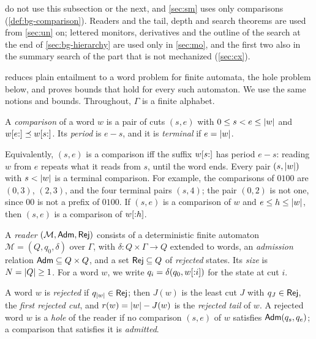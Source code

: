  do not use this subsection or the next, and
\cref{sec:sm} uses only comparisons (\cref{def:bg-comparison}). Readers
and the tail, depth and search theorems are used from \cref{sec:un} on;
lettered monitors, derivatives and the outline of the search at the end of
\cref{sec:bg-hierarchy} are used only in \cref{sec:mo}, and the first two also
in the summary search of the part that is not mechanized (\cref{sec:cx}).

 reduces plain entailment to a word problem for finite
automata, the hole problem below, and proves bounds that hold for every such
automaton. We use the same notions and bounds. Throughout, $\Gamma$ is a finite
alphabet.

\begin{definition}[Comparison]\label{def:bg-comparison}
A \emph{comparison} of a word $w$ is a pair of cuts $(s,e)$ with
$0\le s<e\le\lvert w\rvert$ and $w[e{:}]\preceq w[s{:}]$. Its \emph{period} is $e-s$, and
it is \emph{terminal} if $e=\lvert w\rvert$.
\end{definition}

Equivalently, $(s,e)$ is a comparison iff the suffix $w[s{:}]$ has period
$e-s$: reading $w$ from $e$ repeats what it reads from $s$, until the word ends.
Every pair $(s,\lvert w\rvert)$ with $s<\lvert w\rvert$ is a terminal comparison. For example,
the comparisons of $0100$ are $(0,3)$, $(2,3)$, and the four terminal pairs
$(s,4)$; the pair $(0,2)$ is not one, since $00$ is not a prefix of $0100$. If
$(s,e)$ is a comparison of $w$ and $e\le h\le\lvert w\rvert$, then $(s,e)$ is a
comparison of $w[{:}h]$.

\begin{definition}[Reader]\label{def:bg-reader}
A \emph{reader} $(\mathcal M,\mathsf{Adm},\mathsf{Rej})$ consists of a deterministic finite
automaton $\mathcal M=(Q,q_0,\delta)$ over $\Gamma$, with
$\delta:Q\times\Gamma\to Q$ extended to words, an \emph{admission} relation
$\mathsf{Adm}\subseteq Q\times Q$, and a set $\mathsf{Rej}\subseteq Q$ of \emph{rejected}
states. Its \emph{size} is $N=\lvert Q\rvert\ge1$. For a word $w$, we write
$q_i=\delta(q_0,w[{:}i])$ for the state at cut $i$.
\end{definition}

\begin{definition}[Hole]\label{def:bg-hole}
A word $w$ is \emph{rejected} if $q_{\lvert w\rvert}\in\mathsf{Rej}$; then $J(w)$ is the least
cut $J$ with $q_J\in\mathsf{Rej}$, the \emph{first rejected cut}, and $r(w)=\lvert w\rvert-J(w)$
is the \emph{rejected tail} of $w$. A rejected word $w$ is a \emph{hole} of the
reader if no comparison $(s,e)$ of $w$ satisfies $\mathsf{Adm}(q_s,q_e)$; a comparison
that satisfies it is \emph{admitted}.
\end{definition}

